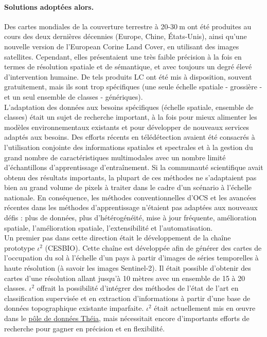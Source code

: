 \paragraph{Solutions adoptées alors.} Des cartes mondiales de la couverture terrestre à 20-30$\:$m ont été produites au cours des deux dernières décennies (Europe, Chine, États-Unis), ainsi qu'une nouvelle version de l'European Corine Land Cover, en utilisant des images satellites. Cependant, elles présentaient une très faible précision à la fois en termes de résolution spatiale et de sémantique, et avec toujours un degré élevé d'intervention humaine. De tels produits LC ont été mis à disposition, souvent gratuitement, mais ils sont trop spécifiques (une seule échelle spatiale - grossière -  et un seul ensemble de classes - génériques).\\
L'adaptation des données aux besoins spécifiques (échelle spatiale, ensemble de classes) était un sujet de recherche important, à la fois pour mieux alimenter les modèles environnementaux existants et pour développer de nouveaux services adaptés aux besoins. Des efforts récents en télédétection avaient été consacrés à l'utilisation conjointe des informations spatiales et spectrales et à la gestion du grand nombre de caractéristiques multimodales avec un nombre limité d'échantillons d'apprentissage
d'entraînement. Si la communauté scientifique avait obtenu des résultats  importants, la plupart de ces méthodes ne s'adaptaient pas bien au grand volume de pixels à traiter dans le cadre d'un scénario à l'échelle nationale. En conséquence, les méthodes conventionnelles d'OCS et les avancées récentes dans les méthodes d'apprentissage n'étaient pas adaptées aux nouveaux défis : plus de données, plus d'hétérogénéité, mise à jour fréquente, amélioration spatiale, l'amélioration spatiale, l'extensibilité et l'automatisation.\\
Un premier pas dans cette direction était le développement de la chaîne prototype $\iota^2$ (CESBIO). Cette chaîne est développée
afin de générer des cartes de l'occupation du sol à l'échelle d'un pays à partir d'images de séries temporelles à haute résolution (à savoir les images Sentinel-2). Il était possible d'obtenir des cartes d'une résolution allant jusqu'à 10 mètres avec un ensemble de 15 à 20 classes. $\iota^2$ offrait la possibilité d'intégrer des méthodes de l'état de l'art en classification supervisée et en extraction d'informations à partir d'une base de données topographique existante imparfaite. $\iota^2$ était actuellement mis en œuvre dans le \href{https://www.theia-land.fr/pole-theia-2/}{pôle de données Théia}, mais nécessitait encore d'importants efforts de recherche pour gagner en précision et en flexibilité.


